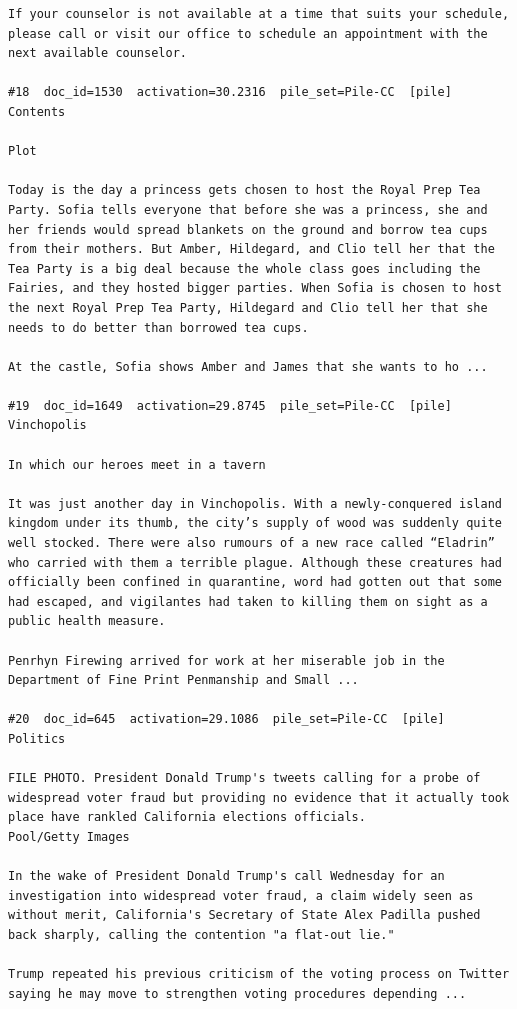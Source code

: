 \begin{verbatim}
If your counselor is not available at a time that suits your schedule, please call or visit our office to schedule an appointment with the next available counselor.

#18  doc_id=1530  activation=30.2316  pile_set=Pile-CC  [pile]
Contents

Plot

Today is the day a princess gets chosen to host the Royal Prep Tea Party. Sofia tells everyone that before she was a princess, she and her friends would spread blankets on the ground and borrow tea cups from their mothers. But Amber, Hildegard, and Clio tell her that the Tea Party is a big deal because the whole class goes including the Fairies, and they hosted bigger parties. When Sofia is chosen to host the next Royal Prep Tea Party, Hildegard and Clio tell her that she needs to do better than borrowed tea cups.

At the castle, Sofia shows Amber and James that she wants to ho ...

#19  doc_id=1649  activation=29.8745  pile_set=Pile-CC  [pile]
Vinchopolis

In which our heroes meet in a tavern

It was just another day in Vinchopolis. With a newly-conquered island kingdom under its thumb, the city’s supply of wood was suddenly quite well stocked. There were also rumours of a new race called “Eladrin” who carried with them a terrible plague. Although these creatures had officially been confined in quarantine, word had gotten out that some had escaped, and vigilantes had taken to killing them on sight as a public health measure.

Penrhyn Firewing arrived for work at her miserable job in the Department of Fine Print Penmanship and Small ...

#20  doc_id=645  activation=29.1086  pile_set=Pile-CC  [pile]
Politics

FILE PHOTO. President Donald Trump's tweets calling for a probe of widespread voter fraud but providing no evidence that it actually took place have rankled California elections officials.
Pool/Getty Images

In the wake of President Donald Trump's call Wednesday for an investigation into widespread voter fraud, a claim widely seen as without merit, California's Secretary of State Alex Padilla pushed back sharply, calling the contention "a flat-out lie."

Trump repeated his previous criticism of the voting process on Twitter saying he may move to strengthen voting procedures depending ...

\end{verbatim}

